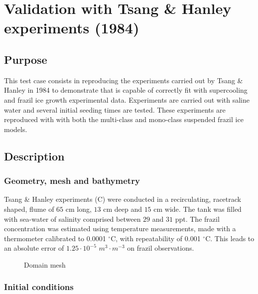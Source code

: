 \renewcommand{\labelitemi}{$\triangleright$}

\chapter{Validation with Tsang \& Hanley experiments (1984)}

\section{Purpose}

This test case consists in reproducing the experiments carried out by Tsang \& Hanley in 1984 \citep{Tsang_1984} 
to demonstrate that \khione is capable of correctly fit with supercooling and frazil ice growth experimental data.
Experiments are carried out with saline water and several initial seeding times are tested.
These experiments are reproduced with \khione with both the multi-class and mono-class suspended frazil ice models.

\section{Description}

\subsection{Geometry, mesh and bathymetry}

Tsang \& Hanley experiments \cite{Tsang_1984} (C) were conducted in a recirculating, racetrack shaped, 
flume of $65$ cm long, $13$ cm deep and $15$ cm wide.
The tank was filled with sea-water of salinity comprised between $29$ and $31$ ppt.
The frazil concentration was estimated using temperature measurements,
made with a thermometer calibrated to 0.0001 $^\circ $C, with repeatability of 0.001 $^\circ$C. 
This leads to an absolute error of $ 1.25 \cdot 10^{-5}$ $m^3\cdot m^{-3}$ on frazil observations.

\begin{figure}[H]
    \begin{center}
    \end{center}
    \caption{Domain mesh}
    \label{fig:growth_mesh}
\end{figure}

\subsection{Initial conditions}

